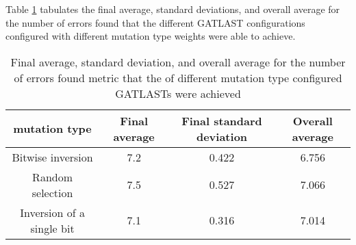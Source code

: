 Table \ref{tab:HP:GA:mutationType:number of errors found} tabulates the final average, standard deviations, and overall average for the number of errors found that the different GATLAST configurations configured with different mutation type weights were able to achieve.
\begin{table}[tbh!]
\centering
\begin{adjustbox}{trim=0cm 0cm 0cm 0cm, clip=true}
\begin{tabular}{|c|c|c|c|}
\hline
mutation type & Final average & Final standard deviation & Overall average\\
\hline
Bitwise inversion & 7.2 & 0.422 & 6.756\\\hline
Random selection & 7.5 & 0.527 & 7.066\\\hline
Inversion of a single bit & 7.1 & 0.316 & 7.014\\\hline
\end{tabular}
\end{adjustbox}
\caption{Final average, standard deviation, and overall average for the number of errors found metric that the of different mutation type configured GATLASTs were achieved}
\label{tab:HP:GA:mutationType:number of errors found}
\end{table}